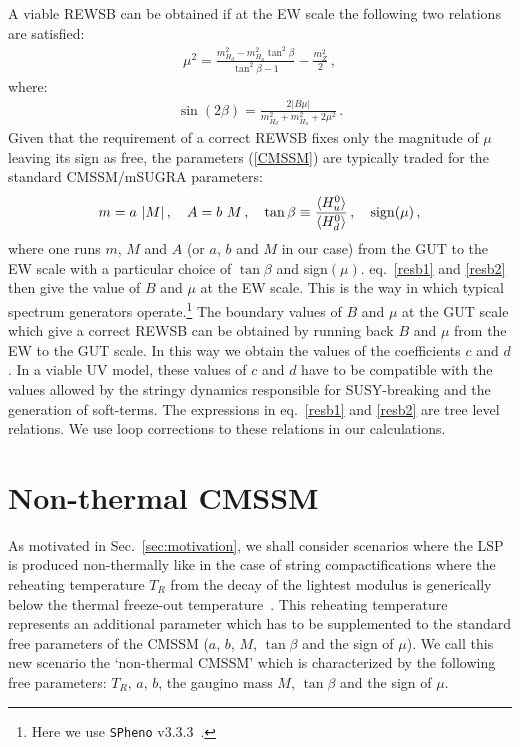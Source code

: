 \documentclass[12pt,a4paper]{book}
\begin{document}
A viable REWSB can be obtained if at the EW scale the following two relations are satisfied:
\begin{align}
\mu^2 = \frac{m_{H_d}^2-m_{H_u}^2 
\tan^2\beta}{\tan^2\beta-1}-\frac{m_Z^2}{2}\,,
\label{resb1}
\end{align}
where:
\begin{align}
\sin(2\beta)=\frac{2 |B\mu|}{m_{H_d}^2+m_{H_u}^2 + 2\mu^2}\,.
\label{resb2}
\end{align}
Given that the requirement of a correct REWSB fixes only the magnitude of $\mu$ leaving its sign as free, the parameters (\ref{CMSSM}) are typically traded for the standard CMSSM/mSUGRA parameters:
\begin{align}
m = a\ |M|\,,\quad A = b\ M\,,\quad \tan\beta\equiv \frac{\langle H_u^0\rangle}{\langle H_d^0\rangle}\,, \quad {\rm sign}(\mu)\,,
\label{CMSSMparameters}
\end{align}
where one runs $m$, $M$ and $A$ (or $a$, $b$ and $M$ in our case) from the GUT to the EW scale with a particular choice of $\tan\beta$ and sign$(\mu)$. eq.~\eqref{resb1} and \eqref{resb2} then give the value of $B$ and $\mu$
at the EW scale. This is the way in which typical spectrum generators operate.\footnote{Here we use \texttt{SPheno} v3.3.3~\cite{Porod:2003um, Porod:2011nf}.} The boundary values of $B$ and $\mu$ at the GUT scale which give a correct REWSB can be obtained by running back $B$ and $\mu$ from the EW to the GUT scale. In this way we obtain the values of the coefficients $c$ and $d$. In a viable UV model, these values of $c$ and $d$ have to be compatible with the values allowed by the stringy dynamics responsible for SUSY-breaking and the generation of soft-terms. The expressions in eq.~\eqref{resb1} and \eqref{resb2} are tree level relations. We use loop corrections to these relations in our calculations.


\section{Non-thermal CMSSM}
\label{ssec:NTDMCMSSMResults}

As motivated in Sec.~\ref{sec:motivation}, we shall consider scenarios where the LSP is produced non-thermally like in the case of string compactifications where the reheating temperature $T_R$ from the decay of the lightest modulus is generically below the thermal freeze-out temperature~\cite{Acharya:2008bk, Acharya:2009zt, Acharya:2010af, Allahverdi:2013noa}. This reheating temperature represents an additional parameter which has to be supplemented to the standard free parameters of the CMSSM ($a$, $b$, $M$, $\tan\beta$ and the sign of $\mu$). We call this new scenario the `non-thermal CMSSM' which is characterized by the following free parameters: $T_R$, $a$, $b$, the gaugino mass $M$, $\tan \beta$ and the sign of $\mu$.
\end{document}
